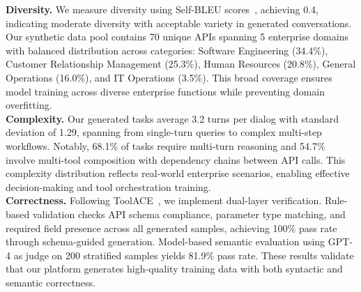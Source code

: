 \documentclass{article}
\theoremstyle{plain}
\theoremstyle{definition}
\theoremstyle{remark}
\begin{document}
\textbf{Diversity.} 
We measure diversity using Self-BLEU scores~\cite{zhu2018texygen}, achieving 0.4, indicating moderate diversity with acceptable variety in generated conversations. Our synthetic data pool contains 70 unique APIs spanning 5 enterprise domains with balanced distribution across categories: Software Engineering (34.4\%), Customer Relationship Management (25.3\%), Human Resources (20.8\%), General Operations (16.0\%), and IT Operations (3.5\%). This broad coverage ensures model training across diverse enterprise functions while preventing domain overfitting.
\\
\noindent \textbf{Complexity.}
Our generated tasks average 3.2 turns per dialog with standard deviation of 1.29, spanning from single-turn queries to complex multi-step workflows. Notably, 68.1\% of tasks require multi-turn reasoning and 54.7\% involve multi-tool composition with dependency chains between API calls. This complexity distribution reflects real-world enterprise scenarios, enabling effective decision-making and tool orchestration training.
\\
\noindent \textbf{Correctness.}
Following ToolACE~\cite{liutoolace}, we implement dual-layer verification. Rule-based validation checks API schema compliance, parameter type matching, and required field presence across all generated samples, achieving 100\% pass rate through schema-guided generation. Model-based semantic evaluation using GPT-4 as judge on 200 stratified samples yields 81.9\% pass rate. These results validate that our platform generates high-quality training data with both syntactic and semantic correctness.



\vspace{-0.2cm}
\end{document}
